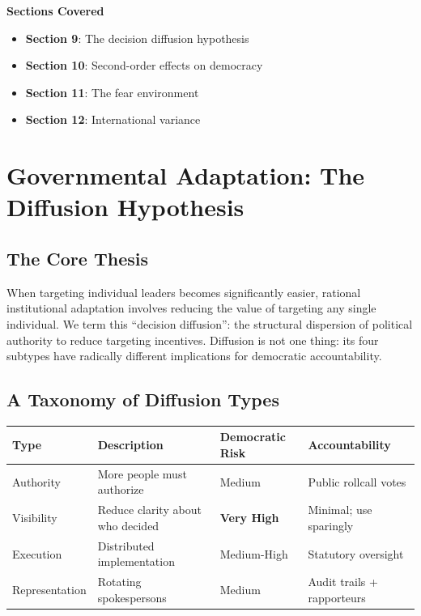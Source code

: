 \documentclass[11pt,letterpaper]{article}
\begin{document}
\begin{center}
\begin{minipage}{0.9\textwidth}
\begin{tcolorbox}[enhanced, colback=white, colframe=instblue!30, boxrule=1pt, arc=4pt,
  left=15pt, right=15pt, top=12pt, bottom=12pt]
\textcolor{instdark}{\textbf{Sections Covered}}
\vspace{0.4em}
\begin{itemize}[nosep]
  \item \textbf{Section 9}: The decision diffusion hypothesis
  \item \textbf{Section 10}: Second-order effects on democracy
  \item \textbf{Section 11}: The fear environment
  \item \textbf{Section 12}: International variance
\end{itemize}
\end{tcolorbox}
\end{minipage}
\end{center}

\vspace{0.8cm}

\section{Governmental Adaptation: The Diffusion Hypothesis}

\subsection{The Core Thesis}

When targeting individual leaders becomes significantly easier, rational institutional adaptation involves reducing the value of targeting any single individual. We term this ``decision diffusion'': the structural dispersion of political authority to reduce targeting incentives. Diffusion is not one thing: its four subtypes have radically different implications for democratic accountability.

\subsection{A Taxonomy of Diffusion Types}

\begin{center}
\small
\begin{tabular}{L{2.6cm}L{5.2cm}L{2.9cm}L{4.4cm}}
\toprule
\textbf{Type} & \textbf{Description} & \textbf{Democratic Risk} & \textbf{Accountability} \\
\midrule
Authority & More people must authorize & Medium & Public rollcall votes \\
Visibility & Reduce clarity about who decided & \textcolor{alertcoral}{\textbf{Very High}} & Minimal; use sparingly \\
Execution & Distributed implementation & Medium-High & Statutory oversight \\
Representation & Rotating spokespersons & Medium & Audit trails + rapporteurs \\
\bottomrule
\end{tabular}
\end{center}
\end{document}
